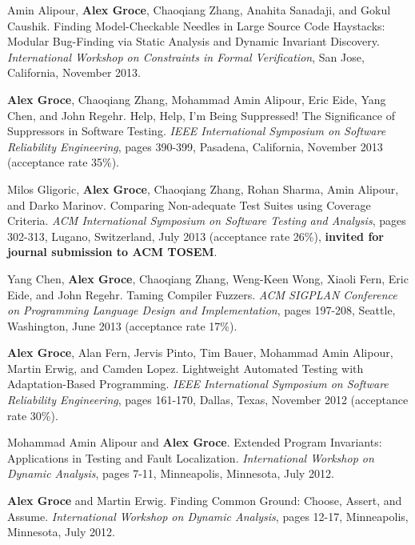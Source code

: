 \documentclass[ComputerScience]{vita}
\begin{document}
\begin{vita}
\begin{Refereed Conference and Workshop Publications}
\item
Amin Alipour, {\bf Alex Groce}, Chaoqiang Zhang, Anahita Sanadaji, and Gokul Caushik.
\newblock Finding Model-Checkable Needles in Large Source Code Haystacks: Modular Bug-Finding via Static Analysis and Dynamic Invariant Discovery.
\newblock \emph{International Workshop on Constraints in Formal Verification}, San Jose, California, November 2013.

\item {\bf Alex Groce}, Chaoqiang Zhang, Mohammad Amin Alipour, Eric Eide, Yang Chen, and John Regehr.
\newblock Help, Help, I'm Being Suppressed! The Significance of Suppressors in Software Testing.
\newblock \emph{IEEE International Symposium on Software Reliability Engineering}, pages 390-399, Pasadena, California, November 2013 (acceptance rate 35\%).

\item Milos Gligoric, {\bf Alex Groce}, Chaoqiang Zhang, Rohan Sharma, Amin Alipour, and Darko Marinov.
\newblock Comparing Non-adequate Test Suites using Coverage Criteria.
\newblock \emph{ACM International Symposium on Software Testing and Analysis}, pages 302-313, Lugano, Switzerland, July 2013 (acceptance rate 26\%), {\bf invited for journal submission to ACM TOSEM}.

\item Yang Chen, {\bf Alex Groce}, Chaoqiang Zhang, Weng-Keen Wong, Xiaoli Fern, Eric Eide, and John Regehr.
\newblock Taming Compiler Fuzzers.
\newblock \emph{ACM SIGPLAN Conference on Programming Language Design and Implementation}, pages 197-208, Seattle, Washington, June 2013 (acceptance rate 17\%).

\item {\bf Alex Groce}, Alan Fern, Jervis Pinto, Tim Bauer, Mohammad Amin Alipour, Martin Erwig, and Camden Lopez.
\newblock Lightweight Automated Testing with Adaptation-Based Programming.
\newblock \emph{IEEE International Symposium on Software Reliability Engineering}, pages 161-170, Dallas, Texas, November 2012 (acceptance rate 30\%).

\item Mohammad Amin Alipour and {\bf Alex Groce}.
\newblock Extended Program Invariants: Applications in Testing and Fault Localization.
\newblock \emph{International Workshop on Dynamic Analysis}, pages 7-11, Minneapolis, Minnesota, July 2012.

\item {\bf Alex Groce} and Martin Erwig.
\newblock Finding Common Ground: Choose, Assert, and Assume.
\newblock \emph{International Workshop on Dynamic Analysis}, pages 12-17, Minneapolis, Minnesota, July 2012.


\end{Refereed Conference and Workshop Publications}
\end{vita}
\end{document}

